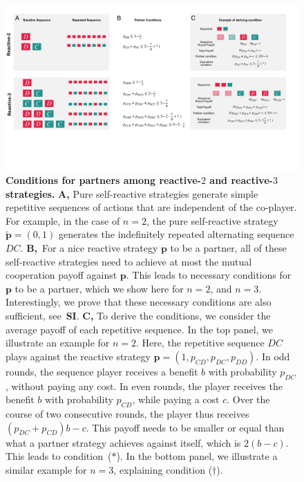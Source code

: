 \documentclass[9pt,twocolumn,twoside]{pnas-new}
\def\SI{\textbf{SI}}
\begin{document}
\begin{figure}[t]
       \centering
       \includegraphics[width=\textwidth]{../../figures/conceptual_figure_conditions.pdf}
       \caption{
       \textbf{Conditions for partners among reactive-$2$ and reactive-$3$ strategies.}
       {\bf A, } Pure self-reactive strategies generate simple repetitive sequences of actions that are independent of the co-player. 
       For example, in the case of \(n\!=\!2\), the pure self-reactive strategy \(\mathbf{\tilde{p}}\!=\!(0, 1)\) generates the indefinitely repeated alternating sequence \(DC\).
       {\bf B,}~For a nice reactive strategy \(\mathbf{p}\) to be a partner, all of these
  self-reactive strategies need to achieve at most the mutual cooperation payoff against $\mathbf{p}$. 
         This leads to necessary conditions for $\mathbf{p}$ to be a partner, which we show here for \(n\!=\!2\), and \(n\!=\!3\).       
         Interestingly, we prove that these necessary conditions are also sufficient, see~\SI.
       {\bf C,} To derive the conditions, we consider the average payoff of each repetitive sequence. 
       In the top panel, we illustrate an example for \(n\!=\!2\). 
       Here, the repetitive sequence  \(DC\) plays against the reactive strategy \(\mathbf{p} = (1, p_{CD}, p_{DC},
       p_{DD})\). 
       In odd rounds, the sequence player receives a benefit \(b\) with probability \(p_{DC}\), without paying any cost. 
       In even rounds, the player receives the benefit \(b\) with probability $p_{CD}$, while paying a cost $c$. 
       Over the course of two consecutive rounds, the player thus receives $(p_{DC}\!+\!p_{CD})b\!-\!c$. 
       This payoff needs to be smaller or equal than what a partner strategy achieves against itself, which is \(2(b\!-\!c)\).
       This leads to condition~($\ast$). 
       In the bottom panel, we illustrate a similar example for $n\!=\!3$, explaining condition ($\dagger$). 
       }\label{fig:conceptual_figure_conditions}
\end{figure}
\end{document}
